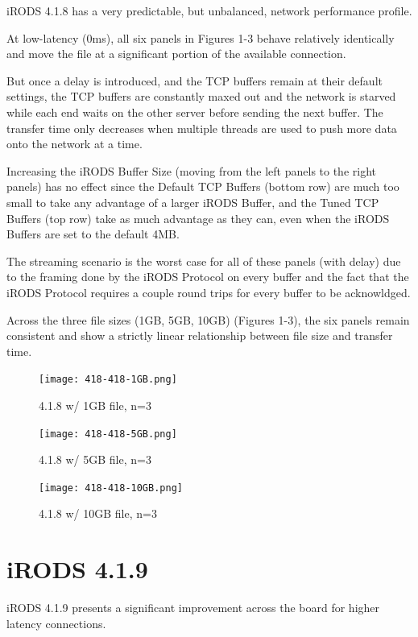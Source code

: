 \documentclass[letter, 11pt]{article}
\begin{document}
iRODS 4.1.8 has a very predictable, but unbalanced, network performance profile.

At low-latency (0ms), all six panels in Figures 1-3 behave relatively identically and move the file at a significant
portion of the available connection.

But once a delay is introduced, and the TCP buffers remain at their default settings, the TCP buffers
are constantly maxed out and the network is starved
while each end waits on the other server before sending the next buffer.  The transfer time only decreases
when multiple threads are used to push more data onto the network at a time.

Increasing the iRODS Buffer Size (moving from the left panels to the right panels) has no effect since the Default
TCP Buffers (bottom row) are much too small to take any advantage of a larger iRODS Buffer, and the Tuned TCP Buffers (top row)
take as much advantage as they can, even when the iRODS Buffers are set to the default 4MB.

The streaming scenario is the worst case for all of these panels (with delay) due to the framing done by the iRODS Protocol
on every buffer and the fact that the iRODS Protocol requires a couple round trips for every buffer to be acknowldged.

Across the three file sizes (1GB, 5GB, 10GB) (Figures 1-3), the six panels remain consistent and show a strictly linear
relationship between file size and transfer time.

\clearpage
\begin{figure}[h]
    \centering
    \texttt{[image: 418-418-1GB.png]}
    \caption{4.1.8 w/ 1GB file, n=3}
\end{figure}

\clearpage
\begin{figure}[h]
    \centering
    \texttt{[image: 418-418-5GB.png]}
    \caption{4.1.8 w/ 5GB file, n=3}
\end{figure}

\clearpage
\begin{figure}[h]
    \centering
    \texttt{[image: 418-418-10GB.png]}
    \caption{4.1.8 w/ 10GB file, n=3}
    \label{418-10gb}
\end{figure}


\clearpage
\section{iRODS 4.1.9}

iRODS 4.1.9 presents a significant improvement across the board for higher latency connections.
\end{document}
